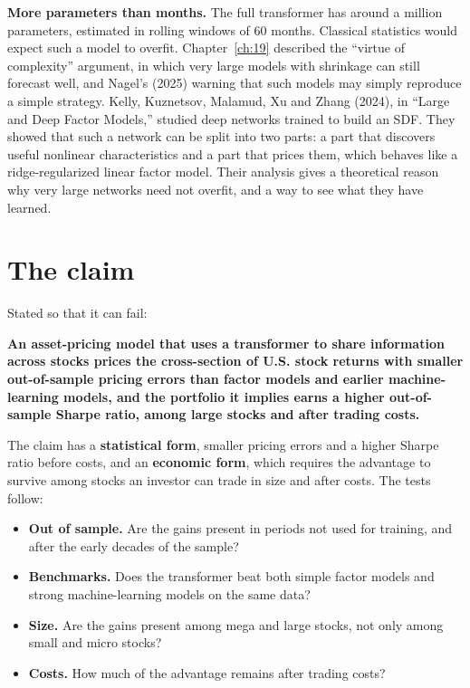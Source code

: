 \textbf{More parameters than months.} The full transformer has around a million parameters, estimated in rolling windows of 60 months. Classical statistics would expect such a model to overfit. Chapter~\ref{ch:19} described the ``virtue of complexity'' argument, in which very large models with shrinkage can still forecast well, and Nagel's (2025) warning that such models may simply reproduce a simple strategy. Kelly, Kuznetsov, Malamud, Xu and Zhang (2024), in ``Large and Deep Factor Models,'' studied deep networks trained to build an SDF. They showed that such a network can be split into two parts: a part that discovers useful nonlinear characteristics and a part that prices them, which behaves like a ridge-regularized linear factor model. Their analysis gives a theoretical reason why very large networks need not overfit, and a way to see what they have learned.

\section{The claim}
\label{sec:20-claim}

Stated so that it can fail:

\begin{callout}
\textbf{An asset-pricing model that uses a transformer to share information across stocks prices the cross-section of U.S. stock returns with smaller out-of-sample pricing errors than factor models and earlier machine-learning models, and the portfolio it implies earns a higher out-of-sample Sharpe ratio, among large stocks and after trading costs.}
\end{callout}

The claim has a \textbf{statistical form}, smaller pricing errors and a higher Sharpe ratio before costs, and an \textbf{economic form}, which requires the advantage to survive among stocks an investor can trade in size and after costs. The tests follow:

\begin{itemize}
  \item \textbf{Out of sample.} Are the gains present in periods not used for training, and after the early decades of the sample?
  \item \textbf{Benchmarks.} Does the transformer beat both simple factor models and strong machine-learning models on the same data?
  \item \textbf{Size.} Are the gains present among mega and large stocks, not only among small and micro stocks?
  \item \textbf{Costs.} How much of the advantage remains after trading costs?
\end{itemize}

